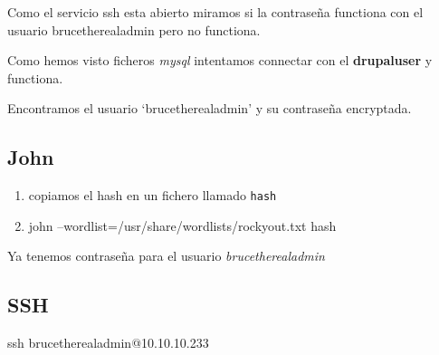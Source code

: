 \documentclass{assets/ipesethesis}
\newenvironment{Shaded}{\begin{snugshade}}{\end{snugshade}}
\newcommand{\ExtensionTok}[1]{#1}
\newcommand{\FunctionTok}[1]{\textcolor[rgb]{0.00,0.00,0.00}{#1}}
\newcommand{\NormalTok}[1]{#1}
\newcommand{\StringTok}[1]{\textcolor[rgb]{0.31,0.60,0.02}{#1}}
\providecommand{\tightlist}{%
  \setlength{\itemsep}{0pt}\setlength{\parskip}{0pt}}
\begin{document}
Como el servicio ssh esta abierto miramos si la contraseña functiona con el usuario brucetherealadmin pero no functiona.

Como hemos visto ficheros \emph{mysql} intentamos connectar con el \textbf{drupaluser} y functiona.

\begin{Shaded}
\end{Shaded}

Encontramos el usuario `brucetherealadmin' y su contraseña encryptada.

\hypertarget{john-1}{%
\subsection*{John}\label{john-1}}

\begin{enumerate}
\def\labelenumi{\arabic{enumi}.}
\tightlist
\item
  copiamos el hash en un fichero llamado \texttt{hash}
\item
  john --wordlist=/usr/share/wordlists/rockyout.txt hash
\end{enumerate}

Ya tenemos contraseña para el usuario \emph{brucetherealadmin}

\hypertarget{ssh}{%
\subsection*{SSH}\label{ssh}}

\begin{Shaded}
\begin{Highlighting}[]
\FunctionTok{ssh}\NormalTok{ brucetherealadmin@10.10.10.233}
\end{Highlighting}
\end{Shaded}
\end{document}
